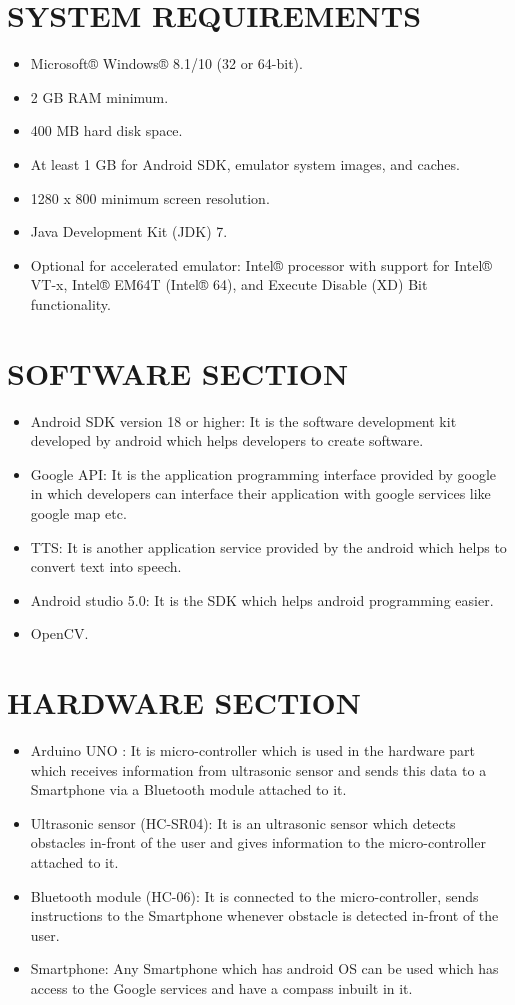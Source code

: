 \documentclass[11pt,a4paper,twoside]{report}
\begin{document}
\section{SYSTEM REQUIREMENTS}
\begin{itemize}
\item Microsoft® Windows® 8.1/10 (32 or 64-bit).
\item 2 GB RAM minimum.
\item 400 MB hard disk space.
\item At least 1 GB for Android SDK, emulator system images, and caches.
\item 1280 x 800 minimum screen resolution.
\item Java Development Kit (JDK) 7.
\item Optional for accelerated emulator: Intel® processor with support for Intel® VT-x, Intel® EM64T (Intel® 64), and Execute Disable (XD) Bit functionality.

\end{itemize}
\section{SOFTWARE SECTION}
\begin{itemize}
\item Android SDK version 18 or higher: It is the software development kit developed
by android which helps developers to create software.
\item Google API: It is the application programming interface provided by google in
which developers can interface their application with google services like google
map etc.
\item TTS: It is another application service provided by the android which helps to
convert text into speech.
\item Android studio 5.0: It is the SDK which helps android programming easier.
\item OpenCV.
\end{itemize}
\section{HARDWARE SECTION}
\begin{itemize}
\item Arduino UNO : It is micro-controller which is used in the hardware part which
receives information from ultrasonic sensor and sends this data to a Smartphone
via a Bluetooth module attached to it.
\item Ultrasonic sensor (HC-SR04): It is an ultrasonic sensor which detects obstacles
in-front of the user and gives information to the micro-controller attached to it.
\item Bluetooth module (HC-06): It is connected to the micro-controller, sends instructions
to the Smartphone whenever obstacle is detected in-front of the user.
\item Smartphone: Any Smartphone which has android OS can be used which has access
to the Google services and have a compass inbuilt in it.


\end{itemize}
\end{document}

